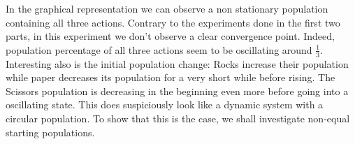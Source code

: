\documentclass[a4paper, 11pt]{article}
\begin{document}
\begin{landscape}
In the graphical representation we can observe a non stationary population containing all three actions. Contrary to the experiments done in the first two parts, in this experiment we don't observe a clear convergence point. Indeed, population percentage of all three actions seem to be oscillating around $\frac{1}{3}$. Interesting also is the initial population change: Rocks increase their population while paper decreases its population for a very short while before rising. The Scissors population is decreasing in the beginning even more before going into a oscillating state. This does suspiciously look like a dynamic system with a circular population. To show that this is the case, we shall investigate non-equal starting populations.

\end{landscape}
\end{document}
